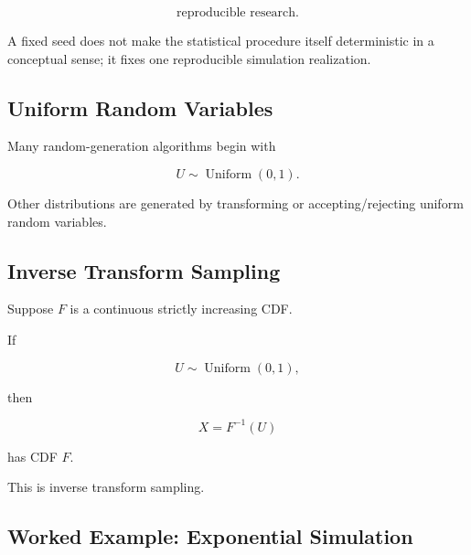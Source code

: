 \[
\boxed{
\text{reproducible research}.
}
\]

A fixed seed does not make the statistical procedure itself deterministic
in a conceptual sense; it fixes one reproducible simulation realization.

\subsection{Uniform Random Variables}
\label{subsec:uniform-random-generation}

Many random-generation algorithms begin with

\[
\boxed{
U
\sim
\operatorname{Uniform}(0,1).
}
\]

Other distributions are generated by transforming or accepting/rejecting
uniform random variables.

\subsection{Inverse Transform Sampling}
\label{subsec:inverse-transform-sampling}

Suppose \(F\) is a continuous strictly increasing CDF.

If

\[
U
\sim
\operatorname{Uniform}(0,1),
\]

then

\[
\boxed{
X
=
F^{-1}(U)
}
\]

has CDF \(F\).

This is inverse transform sampling.

\subsection{Worked Example: Exponential Simulation}
\label{subsec:worked-exponential-simulation}

